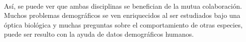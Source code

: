 \documentclass[11pt,spanish,letterpaper]{article}
\theoremstyle{plain}
\begin{document}
\\
As\'i, se puede ver que ambas disciplinas se benefician de la mutua colaboraci\'on. Muchos problemas demogr\'aficos se ven enriquecidos al ser estudiados bajo una \'optica biol\'ogica y muchas preguntas sobre el comportamiento de otras especies, puede ser resulto con la ayuda de datos demogr\'aficos humanos. 


\end{document}

